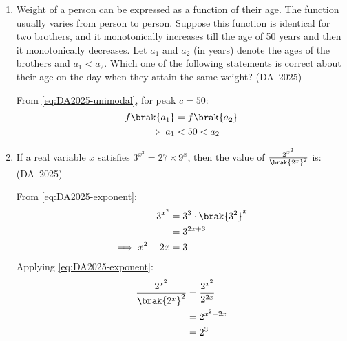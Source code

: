 \begin{enumerate}[label=\thesubsection.\arabic*, ref=\thesubsection.\theenumi]
	\item 
	Weight of a person can be expressed as a function of their age. The function usually varies from person to person. Suppose this function is identical for two brothers, and it monotonically increases till the age of 50 years and then it monotonically decreases. Let $a_1$ and $a_2$ (in years) denote the ages of the brothers and $a_1 < a_2$. Which one of the following statements is correct about their age on the day when they attain the same weight?
	\hfill (DA~2025)
	\begin{enumerate}
	\end{enumerate}
	\solution
	From \eqref{eq:DA2025-unimodal}, for peak $c = 50$:
	\begin{align}
		f\brak{a_1} &= f\brak{a_2}
		\\
		\implies a_1 &< 50 < a_2
	\end{align}
	
	\item 
	If a real variable $x$ satisfies $3^{x^2} = 27 \times 9^x$, then the value of $\frac{2^{x^2}}{\brak{2^x}^2}$ is:
	\hfill (DA~2025)
	\begin{enumerate}
		\begin{multicols}{4}
			\item $2^{-1}$
			\item $2^0$
			\item $2^3$
			\item $2^{15}$
		\end{multicols}
	\end{enumerate}
	\solution
	From \eqref{eq:DA2025-exponent}:
	\begin{align}
		3^{x^2} &= 3^3 \cdot \brak{3^2}^x
		\\
		&= 3^{2x+3}
		\\
		\implies x^2 - 2x &= 3
	\end{align}
	Applying \eqref{eq:DA2025-exponent}:
	\begin{align}
		\frac{2^{x^2}}{\brak{2^x}^2} &= \frac{2^{x^2}}{2^{2x}}
		\\
		&= 2^{x^2 - 2x}
		\\
		&= 2^3
	\end{align}
	

\end{enumerate}
